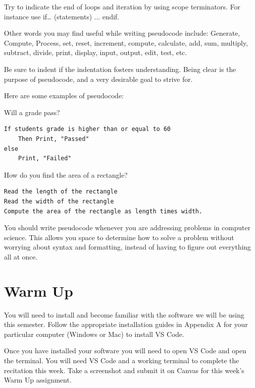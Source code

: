 Try to indicate the end of loops and iteration by using scope terminators.
For instance use if… (statements) ... endif.

Other words you may find useful while writing pseudocode include: Generate, Compute, Process, set, reset, increment, compute, calculate, add, sum, multiply, subtract, divide, print, display, input, output, edit, test, etc.

Be sure to indent if the indentation fosters understanding. Being clear is the purpose of pseudocode, and a very desirable goal to strive for.

Here are some examples of pseudocode:

\begin{example} Will a grade pass?
\begin{verbatim}
If students grade is higher than or equal to 60
	Then Print, "Passed"
else
	Print, "Failed"
\end{verbatim}
    
\end{example}

\begin{example} How do you find the area of a rectangle?
\begin{verbatim}
Read the length of the rectangle
Read the width of the rectangle
Compute the area of the rectangle as length times width.
\end{verbatim}
    
\end{example}

You should write pseudocode whenever you are addressing problems in computer science. This allows you space to determine how to solve a problem without worrying about syntax and formatting, instead of having to figure out everything all at once. 

\section{Warm Up}
You will need to install and become familiar with the software we will be using this semester. Follow the appropriate installation guides in Appendix A for your particular computer (Windows or Mac) to install VS Code. 

Once you have installed your software you will need to open VS Code and open the terminal. You will need VS Code and a working terminal to complete the recitation this week. Take a screenshot and submit it on Canvas for this week's Warm Up assignment. 

